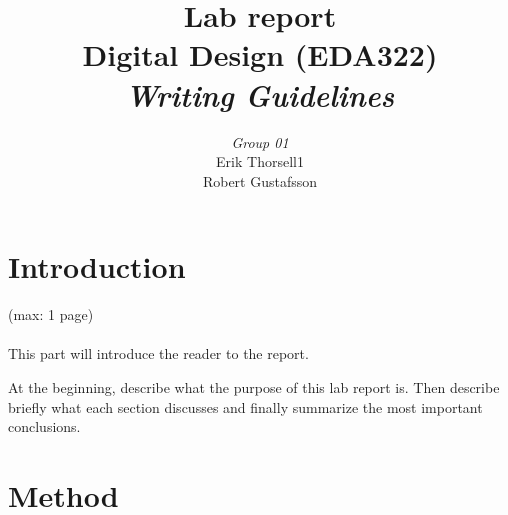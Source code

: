 \documentclass[a4paper,11pt]{article}
\begin{document}
\pagestyle{empty}
\begin{titlepage}

\title{\Huge{Lab report} \\[0.1cm] \Large{Digital Design (EDA322)} \\ [0.4cm] \Large{ \emph{Writing Guidelines}} \\[0.4cm]}
\author{\large{\emph{Group 01}} \\[0.2cm] Erik Thorsell1 \\[0.05cm] Robert Gustafsson \\[0.1cm]}
\maketitle
\thispagestyle{empty}
\end{titlepage}
\clearpage
\pagestyle{fancyplain}
\tableofcontents
\clearpage
\setcounter{page}{1}
\section{Introduction}
(max: 1 page)
\\\\
This part will introduce the reader to the report. 

At the beginning, describe what the purpose of this lab report is. Then describe briefly what each section discusses and finally summarize the most important conclusions. 

\section{Method}
\end{document}
